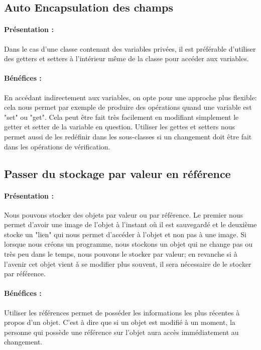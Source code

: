 \documentclass[a4paper,twoside,12pt,openright]{report}
\begin{document}
\subsection{Auto Encapsulation des champs}
\paragraph{Présentation :}
Dans le cas d'une classe contenant des variables privées, il est préférable d'utiliser des getters et setters à l'intérieur même de la classe pour accéder aux variables.

\paragraph{Bénéfices :}
En accédant indirectement aux variables, on opte pour une approche plus flexible: cela nous permet par exemple de produire des opérations quand une variable est "set" ou "get". Cela peut être fait très facilement en modifiant simplement le getter et setter de la variable en question.
Utiliser les gettes et setters nous permet aussi de les redéfinir dans les sous-classes si un changement doit être fait dans les opérations de vérification.\\

\subsection{Passer du stockage par valeur en référence}
\paragraph{Présentation :}
Nous pouvons stocker des objets par valeur ou par référence. Le premier nous permet d'avoir une image de l'objet à l'instant où il est sauvegardé et le deuxième stocke un "lien" qui nous permet d'accéder à l'objet et non pas à une image.
Si lorsque nous créons un programme, nous stockons un objet qui ne change pas ou très peu dans le temps, nous pouvons le stocker par valeur; en revanche si à l'avenir cet objet vient à se modifier plus souvent, il sera nécessaire de le stocker par référence.

\paragraph{Bénéfices :}
Utiliser les références permet de posséder les informations les plus récentes à propos d'un objet. C'est à dire que si un objet est modifié à un moment, la personne qui possède une référence sur l'objet aura accès immédiatement au changement.
\end{document}
